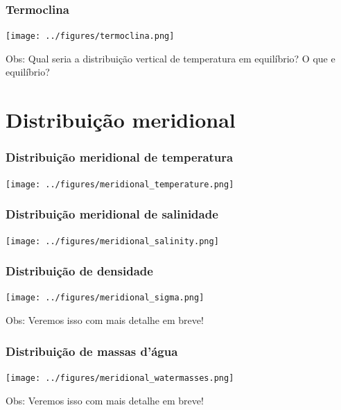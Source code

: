 \begin{frame}
\frametitle{Termoclina}
  \begin{center}
    \texttt{[image: ../figures/termoclina.png]}
  \end{center}
  \scriptsize{Obs: Qual seria a distribuição vertical de temperatura em
                   equilíbrio? O que e equilíbrio?}
\end{frame}


\section{Distribuição meridional}
\begin{frame}
\frametitle{Distribuição meridional de temperatura}
  \begin{center}
    \texttt{[image: ../figures/meridional\_temperature.png]}
  \end{center}
\end{frame}

\begin{frame}
\frametitle{Distribuição meridional de salinidade}
  \begin{center}
    \texttt{[image: ../figures/meridional\_salinity.png]}
  \end{center}
\end{frame}


\begin{frame}
\frametitle{Distribuição de densidade}
  \begin{center}
    \texttt{[image: ../figures/meridional\_sigma.png]}
  \end{center}
  \pause
  \small{Obs: Veremos isso com mais detalhe em breve!}
\end{frame}


\begin{frame}
\frametitle{Distribuição de massas d'água}
  \begin{center}
    \texttt{[image: ../figures/meridional\_watermasses.png]}
  \end{center}
  \pause
  \small{Obs: Veremos isso com mais detalhe em breve!}
\end{frame}


